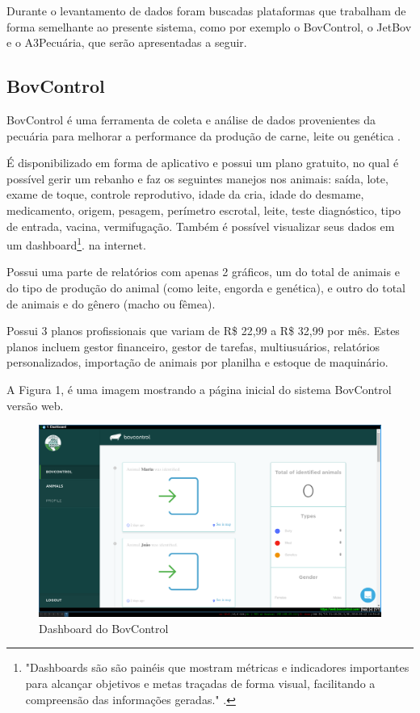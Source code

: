 \documentclass[12pt]{article}
\begin{document}

Durante o levantamento de dados foram buscadas plataformas que trabalham de forma semelhante ao presente sistema, como por exemplo o BovControl, o JetBov e o A3Pecuária, que serão apresentadas a seguir.

\subsection{BovControl}

BovControl é uma ferramenta de coleta e análise de dados provenientes da pecuária para melhorar a performance da produção de carne, leite ou genética \cite{bovcontrol10}. 

É disponibilizado em forma de aplicativo e possui um plano gratuito, no qual é possível gerir um rebanho e faz os seguintes manejos nos animais: saída, lote, exame de toque, controle reprodutivo, idade da cria, idade do desmame, medicamento, origem, pesagem, perímetro escrotal, leite, teste diagnóstico, tipo de entrada, vacina, vermifugação. Também é possível visualizar seus dados em um dashboard\footnote{"Dashboards são são painéis que mostram métricas e indicadores importantes para alcançar objetivos e metas traçadas de forma visual, facilitando a compreensão das informações geradas." \cite{nascimento17}.}. na internet.

Possui uma parte de relatórios com apenas 2 gráficos, um do total de animais e do tipo de produção do animal (como leite, engorda e genética), e outro do total de animais e do gênero (macho ou fêmea). 

Possui 3 planos profissionais que variam de R\$ 22,99 a R\$ 32,99 por mês. Estes planos incluem gestor financeiro, gestor de tarefas, multiusuários, relatórios personalizados, importação de animais por planilha e estoque de maquinário.  

A Figura 1, é uma imagem mostrando a página inicial do sistema BovControl versão web.

\begin{figure}[!h]
	\begin{center}
		\caption{Dashboard do BovControl}
		\includegraphics[width=6in]{img/bovcontrol.png}

	\end{center}
\end{figure}
\end{document}
